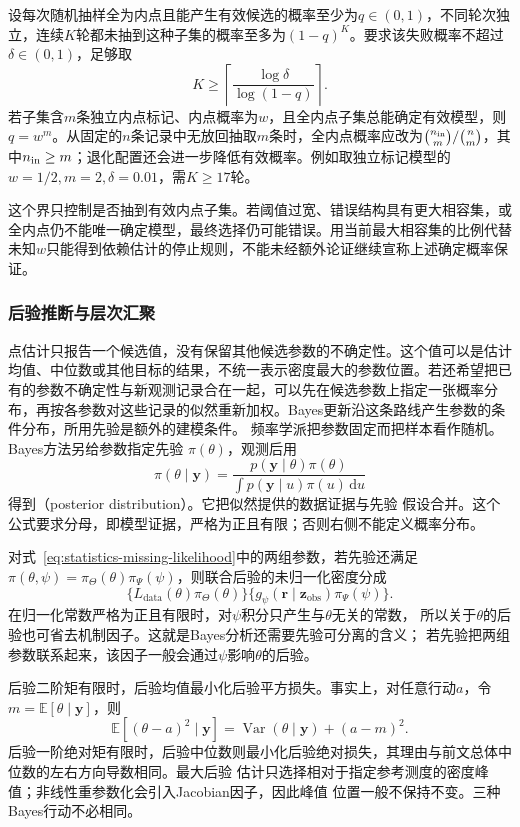 设每次随机抽样全为内点且能产生有效候选的概率至少为\(q\in(0,1)\)，不同轮次独立，连续\(K\)轮都未抽到这种子集的概率至多为\((1-q)^K\)。要求该失败概率不超过\(\delta\in(0,1)\)，足够取
\begin{equation}
 K\geq\left\lceil\frac{\log\delta}{\log(1-q)}\right\rceil.
 \label{eq:statistics-ransac-trials}
\end{equation}
若子集含\(m\)条独立内点标记、内点概率为\(w\)，且全内点子集总能确定有效模型，则\(q=w^m\)。从固定的\(n\)条记录中无放回抽取\(m\)条时，全内点概率应改为\(\binom{n_{\rm in}}m/\binom nm\)，其中\(n_{\rm in}\geq m\)；退化配置还会进一步降低有效概率。例如取独立标记模型的\(w=1/2,m=2,\delta=0.01\)，需\(K\geq17\)轮。

这个界只控制是否抽到有效内点子集。若阈值过宽、错误结构具有更大相容集，或全内点仍不能唯一确定模型，最终选择仍可能错误。用当前最大相容集的比例代替未知\(w\)只能得到依赖估计的停止规则，不能未经额外论证继续宣称上述确定概率保证。

\subsubsection{后验推断与层次汇聚}
点估计只报告一个候选值，没有保留其他候选参数的不确定性。这个值可以是估计均值、中位数或其他目标的结果，不统一表示密度最大的参数位置。若还希望把已有的参数不确定性与新观测记录合在一起，可以先在候选参数上指定一张概率分布，再按各参数对这些记录的似然重新加权。Bayes更新沿这条路线产生参数的条件分布，所用先验是额外的建模条件。
频率学派把参数固定而把样本看作随机。Bayes方法另给参数指定先验
\(\pi(\theta)\)，观测后用
\[
  \pi(\theta\mid\bm y)
  =
  \frac{p(\bm y\mid\theta)\pi(\theta)}
       {\int p(\bm y\mid u)\pi(u)\,\mathrm du}
\]
得到（posterior distribution）。它把似然提供的数据证据与先验
假设合并。这个公式要求分母，即模型证据，严格为正且有限；否则右侧不能定义概率分布。

对式~\eqref{eq:statistics-missing-likelihood}中的两组参数，若先验还满足
\(\pi(\theta,\psi)=\pi_\Theta(\theta)\pi_\Psi(\psi)\)，则联合后验的未归一化密度分成
\[
 \{L_{\mathrm{data}}(\theta)\pi_\Theta(\theta)\}
 \{g_\psi(\bm r\mid\bm z_{\mathrm{obs}})\pi_\Psi(\psi)\}.
\]
在归一化常数严格为正且有限时，对\(\psi\)积分只产生与\(\theta\)无关的常数，
所以关于\(\theta\)的后验也可省去机制因子。这就是Bayes分析还需要先验可分离的含义；
若先验把两组参数联系起来，该因子一般会通过\(\psi\)影响\(\theta\)的后验。

后验二阶矩有限时，后验均值最小化后验平方损失。事实上，对任意行动\(a\)，令
\(m=\mathbb{E}[\theta\mid\bm y]\)，则
\[
  \mathbb{E}[(\theta-a)^2\mid\bm y]
  =\operatorname{Var}(\theta\mid\bm y)+(a-m)^2.
\]
后验一阶绝对矩有限时，后验中位数则最小化后验绝对损失，其理由与前文总体中位数的左右方向导数相同。最大后验
估计只选择相对于指定参考测度的密度峰值；非线性重参数化会引入Jacobian因子，因此峰值
位置一般不保持不变。三种Bayes行动不必相同。

